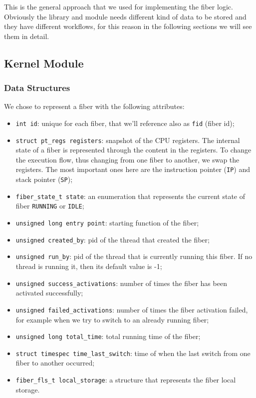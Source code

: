 \documentclass[a4paper,10pt]{article}
\begin{document}
 This is the general approach that we used for implementing the fiber logic. Obviously the library and module needs different kind of data to be stored and they have different workflows, for this reason in the following sections we will see them in detail.

\subsection{Kernel Module}
\subsubsection{Data Structures}\label{subsubsec:kern-datas}
  We chose to represent a fiber with the following attributes:
  \begin{itemize}
    \item \lstinline{int id}: unique for each fiber, that we’ll reference also as \lstinline{fid} (fiber id);
    \item \lstinline{struct pt_regs registers}: snapshot of the CPU registers. The internal state of a fiber is represented through the content in the registers. To change the execution flow, thus changing from one fiber to another, we swap the registers. The most important ones here are the instruction pointer (\texttt{IP}) and stack pointer (\texttt{SP});
    \item \lstinline{fiber_state_t state}: an enumeration that represents the current state of fiber \lstinline{RUNNING} or \lstinline{IDLE};
    \item \lstinline{unsigned long entry point}: starting function of the fiber;
    \item \lstinline{unsigned created_by}: pid of the thread that created the fiber;
    \item \lstinline{unsigned run_by}: pid of the thread that is currently running this fiber. If no thread is running it, then its default value is -1;
    \item \lstinline{unsigned success_activations}: number of times the fiber has been activated successfully;
    \item \lstinline{unsigned failed_activations}: number of times the fiber activation failed, for example when we try to switch to an already running fiber;
    \item \lstinline{unsigned long total_time}: total running time of the fiber;
    \item \lstinline{struct timespec time_last_switch}: time of when the last switch from one fiber to another occurred;
    \item \lstinline{fiber_fls_t local_storage}: a structure that represents the fiber local storage.
  \end{itemize}
\end{document}
